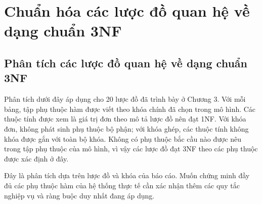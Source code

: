 \chapter{Chuẩn hóa các lược đồ quan hệ về dạng chuẩn 3NF}

\section{Phân tích các lược đồ quan hệ về dạng chuẩn 3NF}
Phân tích dưới đây áp dụng cho 20 lược đồ đã trình bày ở Chương 3. Với mỗi bảng, tập phụ thuộc hàm được viết theo khóa chính đã chọn trong mô hình. Các thuộc tính được xem là giá trị đơn theo mô tả lược đồ nên đạt 1NF. Với khóa đơn, không phát sinh phụ thuộc bộ phận; với khóa ghép, các thuộc tính không khóa được gắn với toàn bộ khóa. Không có phụ thuộc bắc cầu nào được nêu trong tập phụ thuộc của mô hình, vì vậy các lược đồ đạt 3NF theo các phụ thuộc được xác định ở đây.

Đây là phân tích dựa trên lược đồ và khóa của báo cáo. Muốn chứng minh đầy đủ các phụ thuộc hàm của hệ thống thực tế cần xác nhận thêm các quy tắc nghiệp vụ và ràng buộc duy nhất đang áp dụng.

